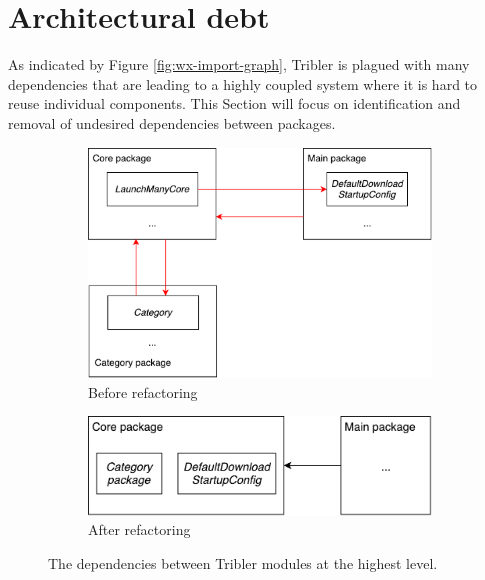 \section{Architectural debt}
As indicated by Figure \ref{fig:wx-import-graph}, Tribler is plagued with many dependencies that are leading to a highly coupled system where it is hard to reuse individual components. This Section will focus on identification and removal of undesired dependencies between packages.

\begin{figure}[h!]
	\centering
	\begin{subfigure}{.5\textwidth}
		\centering
		\includegraphics[width=0.9\linewidth]{images/improving_qa/cycle_tribler_package}
		\caption{Before refactoring}
		\label{fig:tribler-packages-refactoring-before}
	\end{subfigure}%
	\begin{subfigure}{.5\textwidth}
		\centering
		\includegraphics[width=0.9\linewidth]{images/improving_qa/cycle_tribler_package_after}
		\caption{After refactoring}
		\label{fig:tribler-packages-refactoring-after}
	\end{subfigure}
	\caption{The dependencies between Tribler modules at the highest level.}
	\label{fig:tribler-packages-refactor}
\end{figure}

